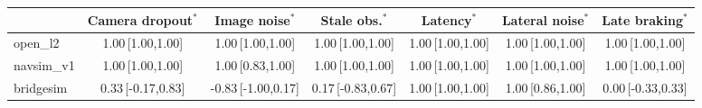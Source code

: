 \begin{tabular}{@{}lcccccc@{}}
\toprule
 & Camera dropout$^{\ast}$ & Image noise$^{\ast}$ & Stale obs.$^{\ast}$ & Latency$^{\ast}$ & Lateral noise$^{\ast}$ & Late braking$^{\ast}$ \\
\midrule
open\_l2 & 1.00\,{\scriptsize[1.00,1.00]} & 1.00\,{\scriptsize[1.00,1.00]} & 1.00\,{\scriptsize[1.00,1.00]} & 1.00\,{\scriptsize[1.00,1.00]} & 1.00\,{\scriptsize[1.00,1.00]} & 1.00\,{\scriptsize[1.00,1.00]} \\
navsim\_v1 & 1.00\,{\scriptsize[1.00,1.00]} & 1.00\,{\scriptsize[0.83,1.00]} & 1.00\,{\scriptsize[1.00,1.00]} & 1.00\,{\scriptsize[1.00,1.00]} & 1.00\,{\scriptsize[1.00,1.00]} & 1.00\,{\scriptsize[1.00,1.00]} \\
bridgesim & 0.33\,{\scriptsize[-0.17,0.83]} & -0.83\,{\scriptsize[-1.00,0.17]} & 0.17\,{\scriptsize[-0.83,0.67]} & 1.00\,{\scriptsize[1.00,1.00]} & 1.00\,{\scriptsize[0.86,1.00]} & 0.00\,{\scriptsize[-0.33,0.33]} \\
\bottomrule
\end{tabular}
